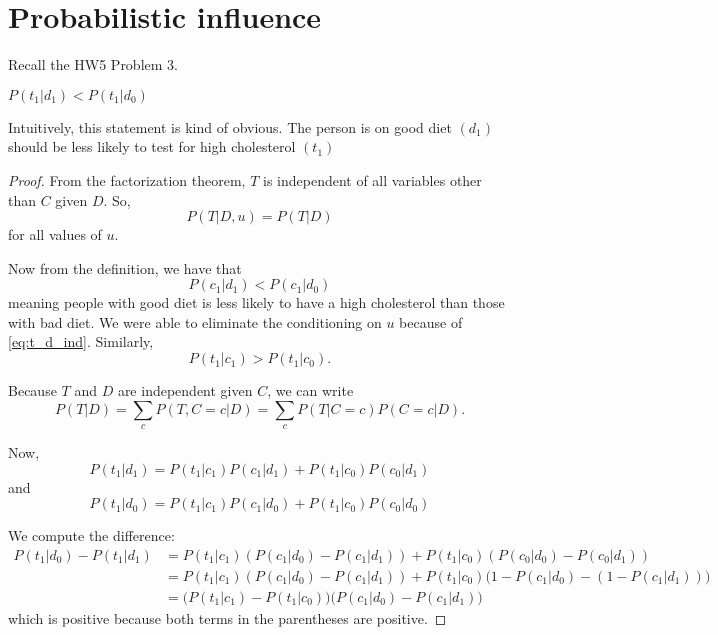 \documentclass{discussion}
\begin{document}


\section{Probabilistic influence}

Recall the HW5 Problem 3. 

\begin{lemma} 
\(P(t_1 | d_1) < P(t_1 | d_0)\)
\end{lemma}
Intuitively, this statement is kind of obvious. The person is on good diet $(d_1)$ should be less likely to test for high cholesterol $(t_1)$
\begin{proof}
From the factorization theorem, $T$ is independent of all variables other than $C$ given $D$. So, 
\begin{equation}
\label{eq:t_d_ind}
	P(T | D, u) = P(T | D)
\end{equation} for all values of $u$.

Now from the definition, we have that
\begin{equation}
	P(c_1 | d_1) < P(c_1 | d_0)
\end{equation}
meaning people with good diet is less likely to have a high cholesterol than those with bad diet. We were able to eliminate the conditioning on $u$ because of \eqref{eq:t_d_ind}.
Similarly,
\[P(t_1 | c_1) > P(t_1 | c_0).\]

Because $T$ and $D$ are independent given $C$, we can write
\[P(T | D) = \sum_{c} P(T, C = c | D) = \sum_{c} P(T| C = c) P(C = c | D).
\]

Now,
\[
P(t_1 | d_1) = P(t_1 | c_1) P(c_1 | d_1) +P(t_1 | c_0) P(c_0 | d_1)
\] 
and
\[P(t_1 | d_0) = P(t_1 | c_1) P(c_1 | d_0)
+P(t_1 | c_0) P(c_0 | d_0)
\]

We compute the difference:
\begin{align*}
P(t_1 | d_0) - P(t_1 | d_1) 
&= P(t_1 | c_1) (P(c_1 | d_0) - P(c_1 | d_1))
+ P(t_1 | c_0) (P(c_0 | d_0) - P(c_0 | d_1)) \\
&= P(t_1 | c_1) (P(c_1 | d_0) - P(c_1 | d_1))
+ P(t_1 | c_0) \big(1 - P(c_1 | d_0) - (1 - P(c_1 | d_1))\big) \\
& = \big(P(t_1 | c_1) - P(t_1 | c_0)\big) \big(P(c_1 | d_0) - P(c_1 | d_1)\big)
\end{align*}
which is positive because both terms in the parentheses are positive.
\end{proof}
\end{document}
